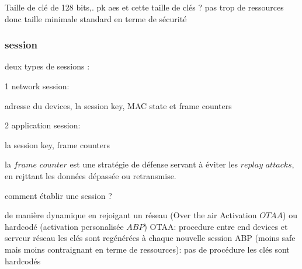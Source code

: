 Taille de clé de 128 bits,.
pk aes et cette taille de clés ? pas trop de ressources donc taille minimale standard en terme de sécurité

\subsubsection{session}

deux types de sessions :

1 network session:

adresse du devices, la session key, MAC state et frame counters

2 application session:

la session key, frame counters

la $frame$ $counter$ est une stratégie de défense servant à éviter les $replay$ $attacks$, en rejttant les données dépassée ou retransmise. 


comment établir une session ?

de manière dynamique en rejoigant un réseau (Over the air Activation $OTAA$) ou hardcodé (activation personalisée $ABP$)
OTAA:
procedure entre end devices et serveur réseau
les clés sont regénérées à chaque nouvelle session
ABP (moins safe mais moins contraignant en terme de ressources):
pas de procédure
les clés sont hardcodés
